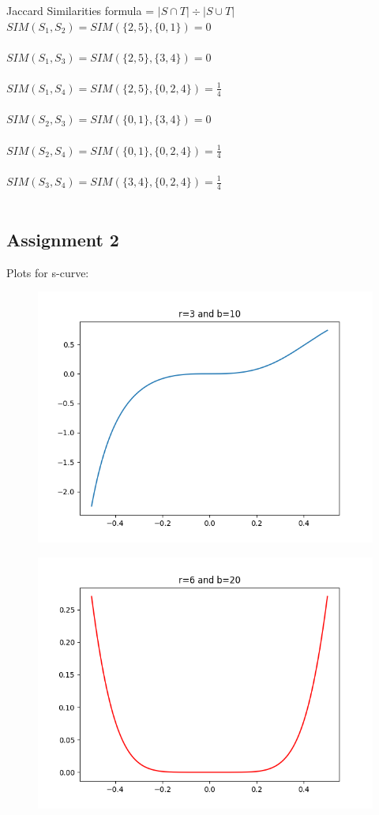 \documentclass[]{scrartcl}
\begin{document}
\vspace{1cm}

Jaccard Similarities formula = $|S \cap T| \div |S \cup T|$ \\

$SIM(S_1, S_2) = SIM(\{2, 5\}, \{0, 1\}) = 0$\\\\
$SIM(S_1, S_3) = SIM(\{2, 5\},\{3, 4\}) = 0$\\\\
$SIM(S_1, S_4) = SIM(\{2, 5\}, \{0, 2, 4\}) = \frac{1}{4}$\\\\
$SIM(S_2, S_3) = SIM(\{0, 1\}, \{3, 4\}) = 0$\\\\
$SIM(S_2, S_4) = SIM(\{0, 1\}, \{0, 2, 4\}) = \frac{1}{4}$\\\\
$SIM(S_3, S_4) = SIM(\{3, 4\}, \{0, 2, 4\}) = \frac{1}{4}$\\\\

\subsection*{Assignment 2}

Plots for s-curve:

\begin{figure}[h]
	\centering
	\includegraphics[width=0.5\linewidth]{Exercise4_plots/plot_1}
\end{figure}

\begin{figure}[h]
	\centering
	\includegraphics[width=0.5\linewidth]{Exercise4_plots/plot_2}
\end{figure}
\end{document}
